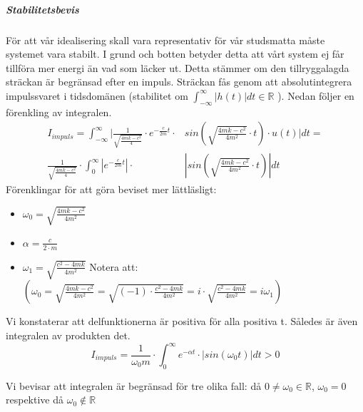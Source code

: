 \documentclass[10pt,a4paper]{article}
\begin{document}
\newpage
\subparagraph{Stabilitetsbevis}
För att vår idealisering skall vara representativ för vår studsmatta måste systemet vara stabilt. I grund och botten betyder detta att vårt system ej får tillföra mer energi än vad som läcker ut. Detta stämmer om den tillryggalagda sträckan är begränsad efter en impuls. Sträckan fås genom att absolutintegrera impulssvaret i tidsdomänen (stabilitet om $\int_{-\infty}^{\infty}|h(t)|dt\in \mathbb{R}$ ). Nedan följer en förenkling av integralen.
\begin{equation}
\begin{split}
I_{impuls}=\int_{-\infty}^{\infty}| \frac{1}{\sqrt{\frac{4  m  k - c^2}{4}} }  \cdot e^{-\frac{c}{2m}  t} \cdot & sin(\sqrt{\frac{4  m  k - c^2}{4  m^2}} \cdot t) \cdot u(t)|dt=\\ \frac{1}{\sqrt{\frac{4  m  k - c^2}{4}} }  \cdot \int_{0}^{\infty}|e^{-\frac{c}{2m}  t}| \cdot & |sin(\sqrt{\frac{4  m  k - c^2}{4  m^2}} \cdot t)|dt
\end{split}
\end{equation}
Förenklingar för att göra beviset mer lättläsligt:
\begin{itemize}
\item $\omega_0=\sqrt{\frac{4  m  k - c^2}{4  m^2}}$
\item $\alpha=\frac{c}{2\cdot m}$
\item $\omega_1=\sqrt{\frac{c^2-4  m  k}{4  m^2}}$
\newline
\newline 
Notera att: $\left( \omega_0=\sqrt{\frac{4  m  k-c^2}{4  m^2}}=\sqrt{(-1)\cdot\frac{c^2-4  m  k}{4  m^2}}=i\cdot\sqrt{\frac{c^2-4  m  k}{4  m^2}}=i \omega_1\right)$
\end{itemize}

Vi konstaterar att delfunktionerna är positiva för alla positiva t. Således är även integralen av produkten det.
$$I_{impuls}=\frac{1}{\omega_0  m} \cdot \int_{0}^{\infty}e^{-\alpha t}\cdot | sin(\omega_0 t)|dt>0$$

Vi bevisar att integralen är begränsad för tre olika fall: då $0\neq\omega_0 \in \mathbb{R}$, $\omega_0=0$ respektive då $\omega_0 \notin \mathbb{R}$
\end{document}
